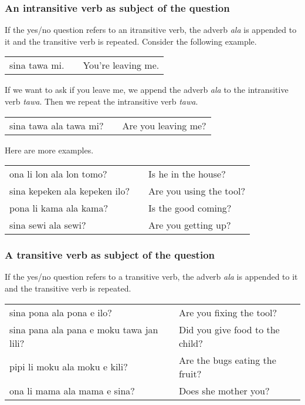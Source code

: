 %
\subsubsection*{An intransitive verb as subject of the question}
%

If the yes/no question refers to an itransitive verb, the adverb \textit{ala} is appended to it and the transitive verb is repeated.
Consider the following example.

\begin{supertabular}{p{5,5cm}|ll}
sina tawa mi. &&  You're leaving me. \\
\end{supertabular} 

If we want to ask if you leave me, we append the adverb \textit{ala} to the intransitive verb \textit{tawa}.
Then we repeat the intransitive verb \textit{tawa}.

\begin{supertabular}{p{5,5cm}|ll}
sina tawa ala tawa mi? &&  Are you leaving me? \\
\end{supertabular}

Here are more examples.

\begin{supertabular}{p{5,5cm}|ll}
ona li lon ala lon tomo? && Is he in the house? \\
sina kepeken ala kepeken ilo? && Are you using the tool? \\
pona li kama ala kama?  && Is the good coming? \\
sina sewi ala sewi? && Are you getting up? \\
\end{supertabular} 

%
\subsubsection*{A transitive verb as subject of the question}
%

If the yes/no question refers to a transitive verb, the adverb \textit{ala} is appended to it and the transitive verb is repeated.

\begin{supertabular}{p{5,5cm}|ll}
sina pona ala pona e ilo? && Are you fixing the tool? \\
sina pana ala pana e moku tawa jan lili? && Did you give food to the child? \\
pipi li moku ala moku e kili? && Are the bugs eating the fruit? \\
ona li mama ala mama e sina? && Does she mother you? \\
\end{supertabular} 


